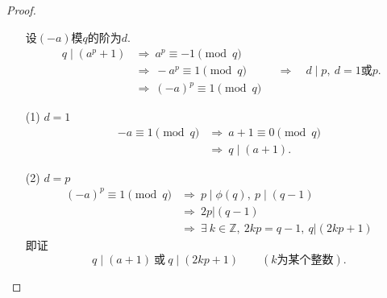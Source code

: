 \documentclass[UTF8]{ctexart}
\begin{document}
\subsection{}   %
\begin{proof}
    \begin{enumerate}
        \item []
        \item []设$(-a)$模$q$的阶为$d$.
        \[
            \begin{aligned}
                q\mid (a^p +1)
                & \Rightarrow\ 
                a^p \equiv -1 \pmod{q}\\
                & \Rightarrow\ 
                -a^p \equiv 1 \pmod{q}\\
                & \Rightarrow\ 
                {(-a)}^p \equiv 1 \pmod{q}
            \end{aligned}
            \quad \Rightarrow \quad
            d\mid p,\ d=1\mbox{或}p.
        \]
        \item [(1)]$d=1$
        \begin{align*}
            -a \equiv 1 \pmod{q}
            & \Rightarrow\ 
            a+1 \equiv 0 \pmod{q}\\
            & \Rightarrow\ 
            q\mid (a+1).
        \end{align*}
        \item [(2)]$d=p$
        \begin{align*}
            {(-a)}^p \equiv 1 \pmod{q}
            & \Rightarrow\ 
            p\mid \phi(q),\ p\mid (q-1)\\
            & \Rightarrow\ 
            2p | (q-1)\\
            & \Rightarrow\ 
            \exists\ k\in \mathbb{Z},\ 2kp = q - 1,\ q| (2kp+1)
        \end{align*}
        即证
        \[
            q\mid (a+1)
            \ \mbox{或}\ 
            q\mid (2kp + 1)
            \qquad
            (k\mbox{为某个整数}).
        \]
    \end{enumerate}
\end{proof}
\end{document}
